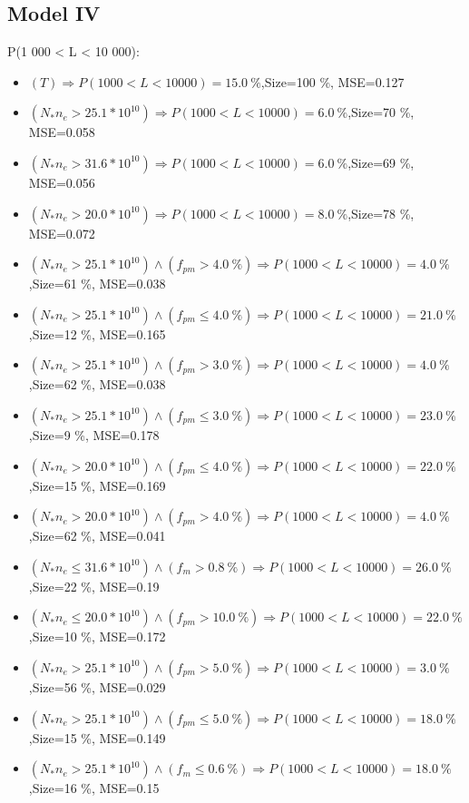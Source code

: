 \documentclass[numbered]{CSL}
\begin{document}
\subsection{Model IV}
P(1 000 < L < 10 000):
\begin{itemize}
\item $(T) \Rightarrow P(1 000 < L < 10 000) = 15.0~\%$,\hfill Size=100 \%, MSE=0.127
\item $(N_* n_e > 25.1 * 10^{10}) \Rightarrow P(1 000 < L < 10 000) = 6.0~\%$,\hfill Size=70 \%, MSE=0.058
\item $(N_* n_e > 31.6 * 10^{10}) \Rightarrow P(1 000 < L < 10 000) = 6.0~\%$,\hfill Size=69 \%, MSE=0.056
\item $(N_* n_e > 20.0 * 10^{10}) \Rightarrow P(1 000 < L < 10 000) = 8.0~\%$,\hfill Size=78 \%, MSE=0.072
\item $(N_* n_e > 25.1 * 10^{10}) \land (f_{pm} > 4.0~\%) \Rightarrow P(1 000 < L < 10 000) = 4.0~\%$,\hfill Size=61 \%, MSE=0.038
\item $(N_* n_e > 25.1 * 10^{10}) \land (f_{pm} \leq 4.0~\%) \Rightarrow P(1 000 < L < 10 000) = 21.0~\%$,\hfill Size=12 \%, MSE=0.165
\item $(N_* n_e > 25.1 * 10^{10}) \land (f_{pm} > 3.0~\%) \Rightarrow P(1 000 < L < 10 000) = 4.0~\%$,\hfill Size=62 \%, MSE=0.038
\item $(N_* n_e > 25.1 * 10^{10}) \land (f_{pm} \leq 3.0~\%) \Rightarrow P(1 000 < L < 10 000) = 23.0~\%$,\hfill Size=9 \%, MSE=0.178
\item $(N_* n_e > 20.0 * 10^{10}) \land (f_{pm} \leq 4.0~\%) \Rightarrow P(1 000 < L < 10 000) = 22.0~\%$,\hfill Size=15 \%, MSE=0.169
\item $(N_* n_e > 20.0 * 10^{10}) \land (f_{pm} > 4.0~\%) \Rightarrow P(1 000 < L < 10 000) = 4.0~\%$,\hfill Size=62 \%, MSE=0.041
\item $(N_* n_e \leq 31.6 * 10^{10}) \land (f_m > 0.8~\%) \Rightarrow P(1 000 < L < 10 000) = 26.0~\%$,\hfill Size=22 \%, MSE=0.19
\item $(N_* n_e \leq 20.0 * 10^{10}) \land (f_{pm} > 10.0~\%) \Rightarrow P(1 000 < L < 10 000) = 22.0~\%$,\hfill Size=10 \%, MSE=0.172
\item $(N_* n_e > 25.1 * 10^{10}) \land (f_{pm} > 5.0~\%) \Rightarrow P(1 000 < L < 10 000) = 3.0~\%$,\hfill Size=56 \%, MSE=0.029
\item $(N_* n_e > 25.1 * 10^{10}) \land (f_{pm} \leq 5.0~\%) \Rightarrow P(1 000 < L < 10 000) = 18.0~\%$,\hfill Size=15 \%, MSE=0.149
\item $(N_* n_e > 25.1 * 10^{10}) \land (f_m \leq 0.6~\%) \Rightarrow P(1 000 < L < 10 000) = 18.0~\%$,\hfill Size=16 \%, MSE=0.15

\end{itemize}
\end{document}
